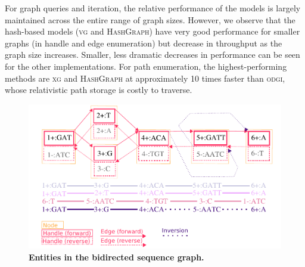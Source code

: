 \documentclass{article}
\begin{document}
For graph queries and iteration, the relative performance of the models is largely maintained across the entire range of graph sizes.
However, we observe that the hash-based models (\textsc{vg} and \textsc{HashGraph}) have very good performance for smaller graphs (in handle and edge enumeration) but decrease in throughput as the graph size increases.
Smaller, less dramatic decreases in performance can be seen for the other implementations.
For path enumeration, the highest-performing methods are \textsc{xg} and \textsc{HashGraph} at approximately 10 times faster than \textsc{odgi}, whose relativistic path storage is costly to traverse.






\FloatBarrier

\begin{figure}
	\begin{center}
		\includegraphics[width=1.0\textwidth]{figures/GRaphchrXpaper.pdf}
	\end{center}
	\caption{{\label{fig:graph}
        \textbf{Entities in the bidirected sequence graph.}  
	}
      }
\end{figure}
\end{document}
